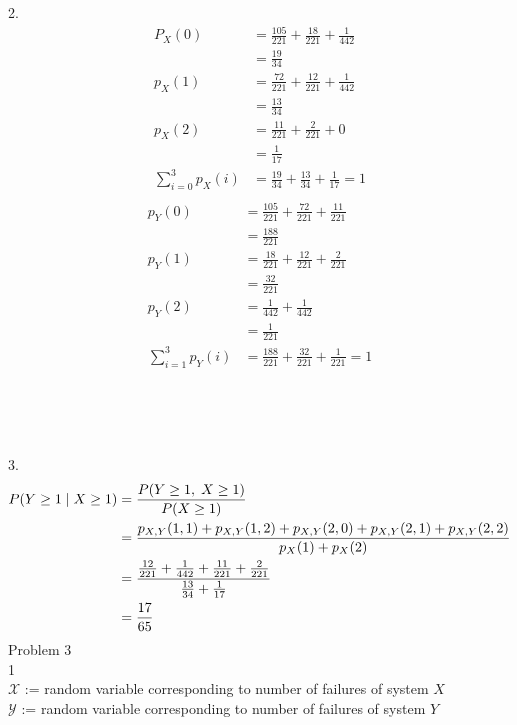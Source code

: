 \documentclass[12pt,border=4pt,multi]{article} %
\begin{document}
2.
\begin{align*}
P_X(0) &= \frac{105}{221} + \frac{18}{221} + \frac{1}{442}\\
&= \boxed{\frac{19}{34}}\\
p_X(1) &= \frac{72}{221} + \frac{12}{221} + \frac{1}{442}\\
&= \boxed{\frac{13}{34}}\\
p_X(2) &= \frac{11}{221} + \frac{2}{221} + 0\\
&= \boxed{\frac{1}{17}}\\
\sum_{i = 0}^3 p_X(i) &= \frac{19}{34} + \frac{13}{34} + \frac{1}{17} = 1\\
\end{align*}
\begin{align*}
p_Y(0) &= \frac{105}{221} + \frac{72}{221} + \frac{11}{221}\\
&= \boxed{\frac{188}{221}}\\
p_Y(1) &= \frac{18}{221} + \frac{12}{221} + \frac{2}{221}\\
&= \boxed{\frac{32}{221}}\\
p_Y(2) &= \frac{1}{442} + \frac{1}{442}\\
&= \boxed{\frac{1}{221}}\\
\sum_{i = 1}^3 p_Y(i) &= \frac{188}{221} + \frac{32}{221} + \frac{1}{221} = 1\\
\end{align*}
\\
\\
\\
\\
3.
\begin{align*}
P(Y \geq 1 \;|\; X \geq 1) &= \frac{P(Y \geq 1,\; X \geq 1)}{P(X \geq 1)}\\
&= \frac{p_{X, Y}(1, 1) + p_{X, Y}(1, 2) + p_{X, Y}(2, 0) + p_{X, Y}(2, 1) + p_{X, Y}(2, 2)}{p_{X}(1) + p_{X}(2)}\\
&= {\large\frac{\frac{12}{221} + \frac{1}{442} + \frac{11}{221} + \frac{2}{221}}{\frac{13}{34} + \frac{1}{17}}}\\
&= \frac{17}{65}\\
\end{align*}
\newpage
\noindent
Problem 3\\
1\\
$\mathcal{X}$ := random variable corresponding to number of failures of system $X$\\
$\mathcal{Y}$ := random variable corresponding to number of failures of system $Y$\\
\\
\end{document}

